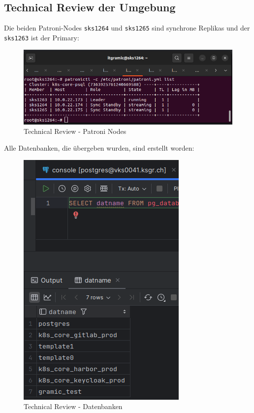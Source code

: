 
\begin{flushleft}
    \subsection{Technical Review der Umgebung}
    Die beiden Patroni-Nodes \texttt{sks1264} und \texttt{sks1265} sind synchrone Replikas und der \texttt{sks1263} ist der Primary:
    \begin{figure}[H]
        \centering
        \includegraphics[width=1\linewidth]{source/implementation/construction_implementation/technical_review/patroni_list}
        \caption{Technical Review - Patroni Nodes}
        \label{fig:patroni_list}
    \end{figure}
\end{flushleft}
\begin{flushleft}
    Alle Datenbanken, die übergeben wurden, sind erstellt worden:
    \begin{figure}[H]
        \centering
        \includegraphics[width=0.5\linewidth]{source/implementation/construction_implementation/technical_review/datenbanken}
        \caption{Technical Review - Datenbanken}
        \label{fig:datenbanken}
    \end{figure}
\end{flushleft}
